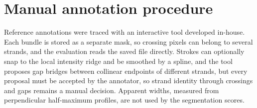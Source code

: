\section{Manual annotation procedure}
\label{sec:supp-annotation}

Reference annotations were traced with an interactive tool developed
in-house. Each bundle is stored as a separate mask, so crossing pixels can
belong to several strands, and the evaluation reads the saved file directly.
Strokes can optionally snap to the local intensity ridge and be smoothed by a
spline, and the tool proposes gap bridges between collinear endpoints of
different strands, but every proposal must be accepted by the annotator, so
strand identity through crossings and gaps remains a manual decision. Apparent
widths, measured from perpendicular half-maximum profiles, are not used by the
segmentation scores.
